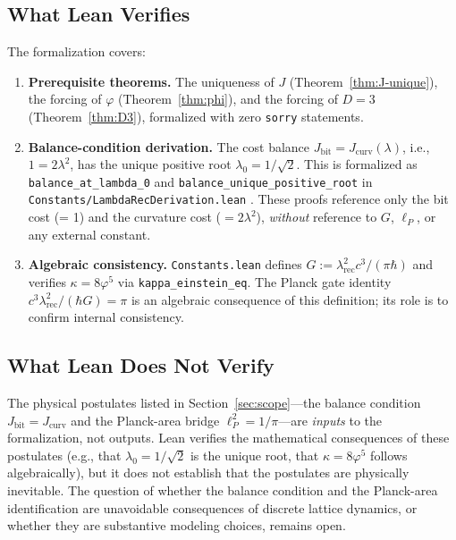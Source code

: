 \documentclass[12pt]{article}
\theoremstyle{definition}
\theoremstyle{remark}
\begin{document}
\subsection{What Lean Verifies}

The formalization covers:
\begin{enumerate}[label=(\roman*)]
  \item \textbf{Prerequisite theorems.} The uniqueness of $J$
    (Theorem~\ref{thm:J-unique}), the forcing of $\varphi$
    (Theorem~\ref{thm:phi}), and the forcing of $D = 3$
    (Theorem~\ref{thm:D3}), formalized with zero \texttt{sorry}
    statements.
  \item \textbf{Balance-condition derivation.} The cost balance
    $J_{\mathrm{bit}} = J_{\mathrm{curv}}(\lambda)$, i.e.,
    $1 = 2\lambda^2$, has the unique positive root
    $\lambda_0 = 1/\sqrt{2}$. This is formalized as
    \texttt{balance\_at\_lambda\_0} and
    \texttt{balance\_unique\_positive\_root} in
    \texttt{Constants/LambdaRecDerivation.lean}
    \cite{WashburnLean4Repo2026}. These proofs reference
    only the bit cost (= 1) and the curvature cost ($= 2\lambda^2$),
    \emph{without} reference to $G$, $\ell_P$, or any external
    constant.
  \item \textbf{Algebraic consistency.} \texttt{Constants.lean}
    defines $G := \lambda_{\mathrm{rec}}^2 c^3/(\pi\hbar)$ and
    verifies $\kappa = 8\varphi^5$ via
    \texttt{kappa\_einstein\_eq}.
    The Planck gate identity
    $c^3\lambda_{\mathrm{rec}}^2/(\hbar G) = \pi$
    is an algebraic consequence of this definition; its role is to
    confirm internal consistency.
\end{enumerate}

\subsection{What Lean Does Not Verify}

The physical postulates listed in Section~\ref{sec:scope}---the
balance condition $J_{\mathrm{bit}} = J_{\mathrm{curv}}$ and the
Planck-area bridge $\ell_P^2 = 1/\pi$---are \emph{inputs} to the
formalization, not outputs. Lean verifies the mathematical
consequences of these postulates (e.g., that $\lambda_0 = 1/\sqrt{2}$
is the unique root, that $\kappa = 8\varphi^5$ follows algebraically),
but it does not establish that the postulates are physically
inevitable. The question of whether the balance condition and the
Planck-area identification are unavoidable consequences of discrete
lattice dynamics, or whether they are substantive modeling choices,
remains open.
\end{document}

